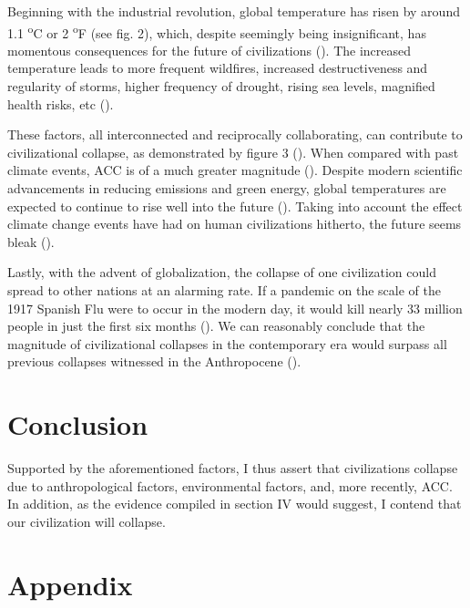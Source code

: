 \documentclass[12pt, a4paper, twoside]{article}
\begin{document}
Beginning with the industrial revolution, global temperature has risen by around 1.1 \textsuperscript{o}C or 2 \textsuperscript{o}F (see fig. 2), which, despite seemingly being insignificant, has momentous consequences for the future of civilizations (\cite{lindsey2024globaltemp}). The increased temperature leads to more frequent wildfires, increased destructiveness and regularity of storms, higher frequency of drought, rising sea levels, magnified health risks, etc (\cites[p.\ 1]{diffenbaugh2021wildfire}[p.\ 4]{aumann2008frequency}[pp.\ 14–16]{dai2011drought}[p.\ 1]{meehl2005howmuch}[p.\ 5]{vermeer2009sealevel}{epa2022airquality}). 

These factors, all interconnected and reciprocally collaborating, can contribute to civilizational collapse, as demonstrated by figure 3 (\cite[p.\ 7]{kanter2009warming}). When compared with past climate events, ACC is of a much greater magnitude (\cite{nasa2010globalwarming}). Despite modern scientific advancements in reducing emissions and green energy, global temperatures are expected to continue to rise well into the future (\cite{ucar2021predictions}). Taking into account the effect climate change events have had on human civilizations hitherto, the future seems bleak (\cite[pp.\ 190–191]{natgeo2007visual}).

Lastly, with the advent of globalization, the collapse of one civilization could spread to other nations at an alarming rate. If a pandemic on the scale of the 1917 Spanish Flu were to occur in the modern day, it would kill nearly 33 million people in just the first six months (\cite{gates2018shattuck}). We can reasonably conclude that the magnitude of civilizational collapses in the contemporary era would surpass all previous collapses witnessed in the Anthropocene (\cite{juling2023future}). 

\section{Conclusion}

Supported by the aforementioned factors, I thus assert that civilizations collapse due to anthropological factors, environmental factors, and, more recently, ACC. In addition, as the evidence compiled in section IV would suggest, I contend that our civilization will collapse. 

\newpage

\section{Appendix}
\end{document}
